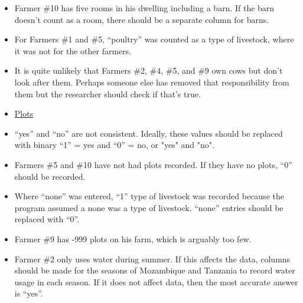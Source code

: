 \documentclass[12pt]{article}
\begin{document}
\begin{itemize}
    \item Farmer \#10 has five rooms in his dwelling including a barn. If the barn doesn’t count as a room, there should be a separate column for barns. 
    \item For Farmers \#1 and \#5, “poultry” was counted as a type of livestock, where it was not for the other farmers.
    \item It is quite unlikely that Farmers \#2, \#4, \#5, and \#9 own cows but don’t look after them. Perhaps someone else has removed that responsibility from them but the researcher should check if that’s true.\renewcommand{\labelitemi}{}
    \item \underline{Plots}
\renewcommand{\labelitemi}{$\bullet$}
    \item “yes” and “no” are not consistent. Ideally, these values should be replaced with binary “1” = yes and “0” = no, or "yes" and "no".
    \item Farmers \#5 and \#10 have not had plots recorded. If they have no plots, “0” should be recorded.
    \item Where “none” was entered, “1” type of livestock was recorded because the program assumed a none was a type of livestock. “none” entries should be replaced with “0”.
    \item Farmer \#9 has -999 plots on his farm, which is arguably too few.
    \item Farmer \#2 only uses water during summer. If this affects the data, columns should be made for the seasons of Mozambique and Tanzania to record water usage in each season. If it does not affect data, then the most accurate answer is “yes”.
\end{itemize}
\end{document}
